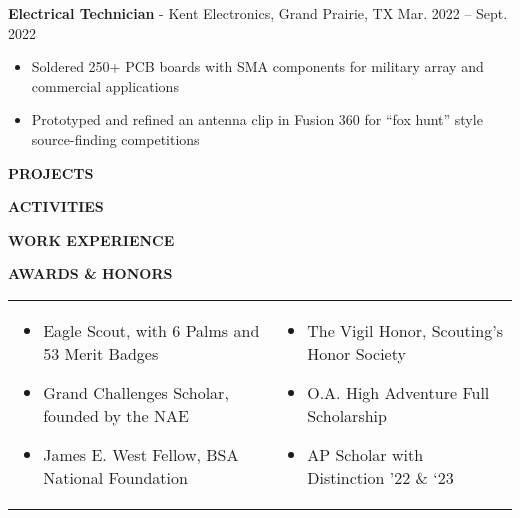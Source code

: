 \documentclass[18pt]{article}
\begin{document}
\textbf{Electrical Technician} - Kent Electronics, Grand Prairie, TX \hfill Mar. 2022 – Sept. 2022

\begin{itemize}[noitemsep]
    \vspace{-\baselineskip}
    \item Soldered 250+ PCB boards with SMA components for military array and commercial applications
    \item Prototyped and refined an antenna clip in Fusion 360 for “fox hunt” style source-finding competitions 
\end{itemize}

\begin{center}
    \textbf{PROJECTS}
    \hrulefill
\end{center}

\begin{center}
    \textbf{ACTIVITIES}
    \hrulefill
\end{center}

\begin{center}
    \textbf{WORK EXPERIENCE}
    \hrulefill
\end{center}

\begin{center}
    \textbf{AWARDS \& HONORS}
    \hrulefill
\end{center}

\begin{tabular}{|p{}|p{}|}

\begin{itemize}[noitemsep]
  \vspace{-\baselineskip}
  \item Eagle Scout, with 6 Palms and 53 Merit Badges
  \item Grand Challenges Scholar, founded by the NAE 
  \item James E. West Fellow, BSA National Foundation
  \vspace{-\baselineskip}
  \end{itemize}
  &
  \vspace{-\baselineskip}
  \begin{itemize}[noitemsep]
  \item The Vigil Honor, Scouting’s Honor Society 
  \item O.A. High Adventure Full Scholarship
  \item AP Scholar with Distinction ’22 \& ‘23 
  \vspace{-\baselineskip}
\end{itemize}\\

\end{tabular}
\end{document}
